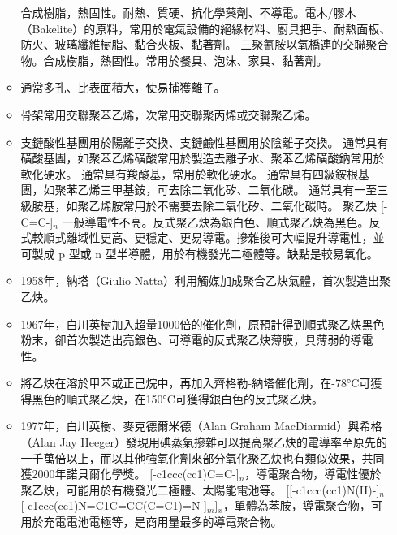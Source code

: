 \documentclass[a4paper,12pt]{report}
\begin{document}
\begin{itemize}
\begin{itemize}
合成樹脂，熱固性。耐熱、質硬、抗化學藥劑、不導電。電木/膠木（Bakelite）的原料，常用於電氣設備的絕緣材料、廚具把手、耐熱面板、防火、玻璃纖維樹脂、黏合夾板、黏著劑。
三聚氰胺以氧橋連的交聯聚合物。合成樹脂，熱固性。常用於餐具、泡沫、家具、黏著劑。
\bit
\item 通常多孔、比表面積大，使易捕獲離子。
\item 骨架常用交聯聚苯乙烯，次常用交聯聚丙烯或交聯聚乙烯。
\item 支鏈酸性基團用於陽離子交換、支鏈鹼性基團用於陰離子交換。
\eit
{}
通常具有磺酸基團，如聚苯乙烯磺酸常用於製造去離子水、聚苯乙烯磺酸鈉常用於軟化硬水。
通常具有羧酸基，常用於軟化硬水。
通常具有四級銨根基團，如聚苯乙烯三甲基銨，可去除二氧化矽、二氧化碳。
通常具有一至三級胺基，如聚乙烯胺常用於不需要去除二氧化矽、二氧化碳時。
聚乙炔 [-C=C-]$_n$ 一般導電性不高。反式聚乙炔為銀白色、順式聚乙炔為黑色。反式較順式離域性更高、更穩定、更易導電。摻雜後可大幅提升導電性，並可製成 p 型或 n 型半導體，用於有機發光二極體等。缺點是較易氧化。
\bit
\item 1958年，納塔（Giulio Natta）利用觸媒加成聚合乙炔氣體，首次製造出聚乙炔。
\item 1967年，白川英樹加入超量1000倍的催化劑，原預計得到順式聚乙炔黑色粉末，卻首次製造出亮銀色、可導電的反式聚乙炔薄膜，具薄弱的導電性。
\item 將乙炔在溶於甲苯或正己烷中，再加入齊格勒-納塔催化劑，在-78°C可獲得黑色的順式聚乙炔，在150°C可獲得銀白色的反式聚乙炔。
\item 1977年，白川英樹、麥克德爾米德（Alan Graham MacDiarmid）與希格（Alan Jay Heeger）發現用碘蒸氣摻雜可以提高聚乙炔的電導率至原先的一千萬倍以上，而以其他強氧化劑來部分氧化聚乙炔也有類似效果，共同獲2000年諾貝爾化學獎。
\eit
{}
[-c1ccc(cc1)C=C-]$_n$，導電聚合物，導電性優於聚乙炔，可能用於有機發光二極體、太陽能電池等。
[[-c1ccc(cc1)N(H)-]$_n$[-c1ccc(cc1)N=C1C=CC(C=C1)=N-]$_m$]$_x$，單體為苯胺，導電聚合物，可用於充電電池電極等，是商用量最多的導電聚合物。

\end{itemize}
\end{itemize}
\end{document}
